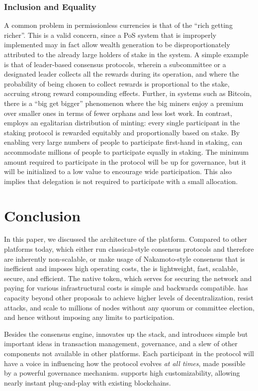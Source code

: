 \documentclass[runningheads]{llncs}
\begin{document}
\subsubsection{Inclusion and Equality}
A common problem in permissionless currencies is that of the ``rich getting richer''. This is a valid concern, since a PoS system that is improperly implemented may in fact allow wealth generation to be disproportionately attributed to the already large holders of stake in the system. A simple example is that of leader-based consensus protocols, wherein a subcommittee or a designated leader collects all the rewards during its operation, and where the probability of being chosen to collect rewards is proportional to the stake, accruing strong reward compounding effects. Further, in systems such as Bitcoin, there is a ``big get bigger'' phenomenon where the big miners enjoy a premium over smaller ones in terms of fewer orphans and less lost work.
In contrast, \AVAPlatformName{} employs an egalitarian distribution of minting: every single participant in the staking protocol is rewarded equitably and proportionally based on stake. By enabling very large numbers of people to participate first-hand in staking, \AVAPlatformName{} can accommodate millions of people to participate equally in staking. The minimum amount required to participate in the protocol will be up for governance, but it will be initialized to a low value to encourage wide participation. This also implies that delegation is not required to participate with a small allocation. 

\section{Conclusion}
\label{section:conclusion}
In this paper, we discussed the architecture of the \AVAPlatformName{} platform. Compared to other platforms today, which either run classical-style consensus protocols and therefore are inherently non-scalable, or make usage of Nakamoto-style consensus that is inefficient and imposes high operating costs, the \AVAPlatformName{} is lightweight, fast, scalable, secure, and efficient. The native token, which serves for securing the network and paying for various infrastructural costs is simple and backwards compatible. \AVATokenName{} has capacity beyond other proposals to achieve higher levels of decentralization, resist attacks, and scale to millions of nodes without any quorum or committee election, and hence without imposing any limits to participation. 

Besides the consensus engine, \AVAPlatformName{} innovates up the stack, and introduces simple but important ideas in transaction management, governance, and a slew of other components not available in other platforms. Each participant in the protocol will have a voice in influencing how the protocol evolves \emph{at all times}, made possible by a powerful governance mechanism. \AVAPlatformName{} supports high customizability, allowing nearly instant plug-and-play with existing blockchains. 



\end{document}
